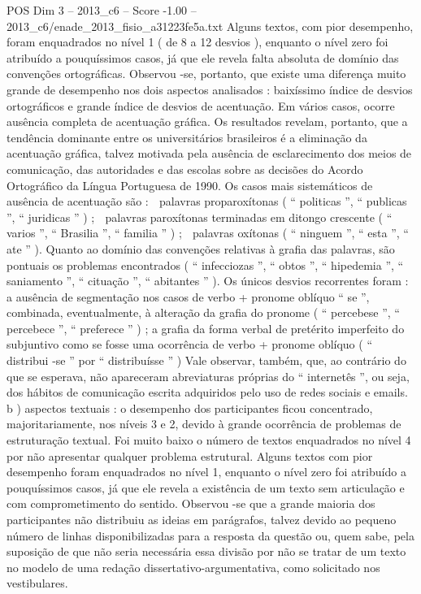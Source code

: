 \begin{textsample}{POS Dim 3 – 2013\_c6 – Score -1.00 – 2013\_c6/enade\_2013\_fisio\_a31223fe5a.txt}
Alguns textos, com pior desempenho, foram enquadrados no nível 1 ( de 8 a 12 desvios ), enquanto o nível zero foi atribuído a pouquíssimos casos, já que ele revela falta absoluta de domínio das convenções ortográficas.
Observou -se, portanto, que existe uma diferença muito grande de desempenho nos dois aspectos analisados : baixíssimo índice de desvios ortográficos e grande índice de desvios de acentuação.
Em vários casos, ocorre ausência completa de acentuação gráfica.
Os resultados revelam, portanto, que a tendência dominante entre os universitários brasileiros é a eliminação da acentuação gráfica, talvez motivada pela ausência de esclarecimento dos meios de comunicação, das autoridades e das escolas sobre as decisões do Acordo Ortográfico da Língua Portuguesa de 1990.
Os casos mais sistemáticos de ausência de acentuação são :  palavras proparoxítonas ( “ politicas ”, “ publicas ”, “ juridicas ” ) ;  palavras paroxítonas terminadas em ditongo crescente ( “ varios ”, “ Brasilia ”, “ familia ” ) ;  palavras oxítonas ( “ ninguem ”, “ esta ”, “ ate ” ).
Quanto ao domínio das convenções relativas à grafia das palavras, são pontuais os problemas encontrados ( “ infecciozas ”, “ obtos ”, “ hipedemia ”, “ saniamento ”, “ cituação ”, “ abitantes ” ).
Os únicos desvios recorrentes foram : a ausência de segmentação nos casos de verbo + pronome oblíquo “ se ”, combinada, eventualmente, à alteração da grafia do pronome ( “ percebese ”, “ percebece ”, “ preferece ” ) ; a grafia da forma verbal de pretérito imperfeito do subjuntivo como se fosse uma ocorrência de verbo + pronome oblíquo ( “ distribui -se ” por “ distribuísse ” ) Vale observar, também, que, ao contrário do que se esperava, não apareceram abreviaturas próprias do “ internetês ”, ou seja, dos hábitos de comunicação escrita adquiridos pelo uso de redes sociais e emails. b ) aspectos textuais : o desempenho dos participantes ficou concentrado, majoritariamente, nos níveis 3 e 2, devido à grande ocorrência de problemas de estruturação textual.
Foi muito baixo o número de textos enquadrados no nível 4 por não apresentar qualquer problema estrutural.
Alguns textos com pior desempenho foram enquadrados no nível 1, enquanto o nível zero foi atribuído a pouquíssimos casos, já que ele revela a existência de um texto sem articulação e com comprometimento do sentido.
Observou -se que a grande maioria dos participantes não distribuiu as ideias em parágrafos, talvez devido ao pequeno número de linhas disponibilizadas para a resposta da questão ou, quem sabe, pela suposição de que não seria necessária essa divisão por não se tratar de um texto no modelo de uma redação dissertativo-argumentativa, como solicitado nos vestibulares.

\end{textsample}
